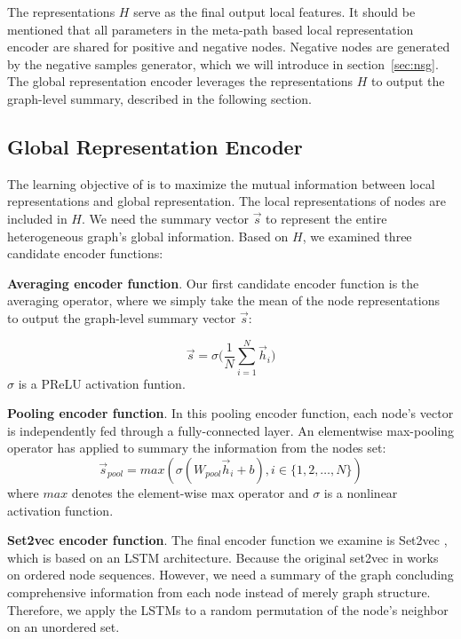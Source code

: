 \documentclass[conference]{IEEEtran}
\begin{document}
	The representations $H$ serve as the final output local features. 
	It should be mentioned that all parameters in the meta-path based local representation encoder are shared for positive and negative nodes. Negative nodes are generated by the negative samples generator, which we will introduce in section~\ref{sec:nsg}. 
	The global representation encoder leverages the representations $H$ to output the graph-level summary, described in the following section.
	
\subsection{Global Representation Encoder}\label{sec:global}
The learning objective of {\our} is to maximize the mutual information between local representations and global representation. The local representations of nodes are included in $H$. We need the summary vector $\vec{s}$ to represent the entire heterogeneous graph's global information. Based on $H$, we examined three candidate encoder functions:
	
	\noindent
	\textbf{Averaging encoder function}. Our first candidate encoder function is the averaging operator, where we simply
	take the mean of the node representations to output the graph-level summary vector $\vec{s}$:
	
\begin{equation}
		\vec{s} =\sigma\Bigg(\frac{1}{N} \sum_{i =1}^N \vec{h}_i\Bigg)
\end{equation}
$\sigma$ is a PReLU activation funtion.
	\noindent
	
	
	\noindent
	\textbf{Pooling encoder function}. In this pooling encoder function, each node's vector is independently fed through a fully-connected layer. An elementwise max-pooling operator has applied to summary the information from the nodes set:
\begin{equation}
		\vec{s}_{pool} =max(\sigma(W_{pool}\vec{h}_i + b), i \in \{1,2,\dots,N\})
\end{equation}
\noindent
	where $max$ denotes the element-wise max operator and $\sigma$ is a nonlinear activation function.
	
	\noindent
	\textbf{Set2vec encoder function}. The final encoder function we examine is Set2vec \cite{VBK16}, which is based on an LSTM architecture. 
Because the original set2vec in \cite{VBK16} works on ordered node sequences. However, we need a summary of the graph concluding comprehensive information from each node instead of merely graph structure. Therefore, we apply the LSTMs to a random permutation of the node's neighbor on an unordered set.
	
\end{document}
